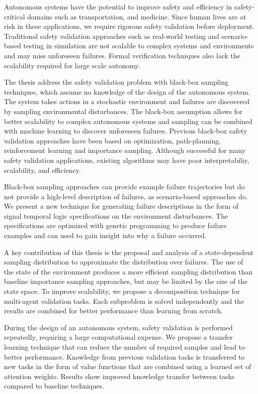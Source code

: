 Autonomous systems have the potential to improve safety and efficiency in safety-critical domains such as transportation, and medicine. Since human lives are at risk in these applications, we require rigorous safety validation before deployment. Traditional safety validation approaches such as real-world testing and scenario-based testing in simulation are not scalable to complex systems and environments and may miss unforeseen failures. Formal verification techniques also lack the scalability required for large scale autonomy. 

The thesis address the safety validation problem with black-box sampling techniques, which assume no knowledge of the design of the autonomous system. The system takes actions in a stochastic environment and failures are discovered by sampling environmental disturbances. The black-box assumption allows for better scalability to complex autonomous systems and sampling can be combined with machine learning to discover unforeseen failures. Previous black-box safety validation approaches have been based on optimization, path-planning, reinforcement learning and importance sampling. Although successful for many safety validation applications, existing algorithms may have poor interpretabiliy, scalability, and efficiency. 

Black-box sampling approaches can provide example failure trajectories but do not provide a high-level description of failures, as scenario-based approaches do. We present a new technique for generating failure descriptions in the form of signal temporal logic specifications on the environment disturbances. The specifications are optimized with genetic programming to produce failure examples and can used to gain insight into why a failure occurred. 

A key contribution of this thesis is the proposal and analysis of a state-dependent sampling distribution to approximate the distribution over failures. The use of the state of the environment produces a more efficient sampling distribution than baseline importance sampling approaches, but may be limited by the size of the state space. To improve scalability, we propose a decomposition technique for multi-agent validation tasks. Each subproblem is solved independently and the results are combined for better performance than learning from scratch.

During the design of an autonomous system, safety validation is performed repeatedly, requiring a large computational expense. We propose a transfer learning technique that can reduce the number of required samples and lead to better performance. Knowledge from previous validation tasks is transferred to new tasks in the form of value functions that are combined using a learned set of attention weights. Results show improved knowledge transfer between tasks compared to baseline techniques. 

